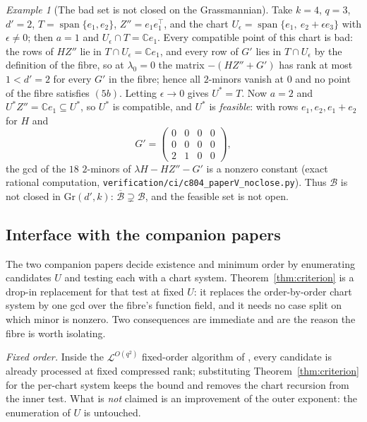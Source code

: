 \documentclass[journal]{IEEEtran}
\theoremstyle{plainn}
\theoremstyle{remark}
\newtheorem{example}[thm]{Example}
\begin{document}
\begin{example}[The bad set is not closed on the Grassmannian]\label{ex:noclose}
Take $k=4$, $q=3$, $d'=2$, $T=\operatorname{span}\{e_1,e_2\}$, $Z''=e_1e_1^{\top}$, and the chart
$U_\epsilon=\operatorname{span}\{e_1,\ e_2+\epsilon e_3\}$ with $\epsilon\ne0$; then $a=1$ and
$U_\epsilon\cap T=\mathbb Ce_1$. Every compatible point of this chart is bad: the rows of $HZ''$ lie in
$T\cap U_\epsilon=\mathbb Ce_1$, and every row of $G'$ lies in $T\cap U_\epsilon$ by the definition of
the fibre, so at $\lambda_0=0$ the matrix $-(HZ''+G')$ has rank at most $1<d'=2$ for every $G'$ in the
fibre; hence all $2$-minors vanish at $0$ and no point of the fibre satisfies $(5b)$.
Letting $\epsilon\to0$ gives $U^\ast=T$. Now $a=2$ and $U^\ast Z''=\mathbb Ce_1\subseteq U^\ast$, so
$U^\ast$ is compatible, and $U^\ast$ is \emph{feasible}: with rows $e_1,e_2,e_1+e_2$ for $H$ and
\[
G'=\begin{pmatrix}0&0&0&0\\0&0&0&0\\2&1&0&0\end{pmatrix},
\]
the gcd of the $18$ $2$-minors of $\lambda H-HZ''-G'$ is a nonzero constant (exact rational
computation, \texttt{verification/ci/c804\_paperV\_noclose.py}). Thus $\mathcal B$ is not closed in
$\mathrm{Gr}(d',k)$: $\overline{\mathcal B}\supsetneq\mathcal B$, and the feasible set is not open.
\end{example}

\subsection{Interface with the companion papers}\label{sec:interface}

The two companion papers decide existence and minimum order by enumerating candidates $U$ and
testing each with a chart system. Theorem~\ref{thm:criterion} is a drop-in replacement for that test
at fixed $U$: it replaces the order-by-order chart system by one gcd over the fibre's function field,
and it needs no case split on which minor is nonzero. Two consequences are immediate and are the
reason the fibre is worth isolating.

\emph{Fixed order.} Inside the $\mathcal L^{O(q^2)}$ fixed-order algorithm of \cite{paperI}, every
candidate is already processed at fixed compressed rank; substituting
Theorem~\ref{thm:criterion} for the per-chart system keeps the bound and removes the chart recursion
from the inner test. What is \emph{not} claimed is an improvement of the outer exponent: the
enumeration of $U$ is untouched.
\end{document}
